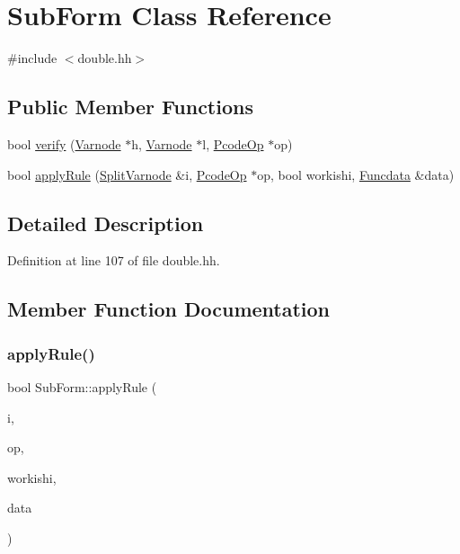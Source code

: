 \hypertarget{class_sub_form}{}\section{Sub\+Form Class Reference}
\label{class_sub_form}


{\ttfamily \#include $<$double.\+hh$>$}

\subsection*{Public Member Functions}
\begin{DoxyCompactItemize}
\item 
bool \mbox{\hyperlink{class_sub_form_a9c6777b111bd5112862b798818ad2250}{verify}} (\mbox{\hyperlink{class_varnode}{Varnode}} $\ast$h, \mbox{\hyperlink{class_varnode}{Varnode}} $\ast$l, \mbox{\hyperlink{class_pcode_op}{Pcode\+Op}} $\ast$op)
\item 
bool \mbox{\hyperlink{class_sub_form_a63a1ea611a21bbd987ad99ce18c8e478}{apply\+Rule}} (\mbox{\hyperlink{class_split_varnode}{Split\+Varnode}} \&i, \mbox{\hyperlink{class_pcode_op}{Pcode\+Op}} $\ast$op, bool workishi, \mbox{\hyperlink{class_funcdata}{Funcdata}} \&data)
\end{DoxyCompactItemize}


\subsection{Detailed Description}


Definition at line 107 of file double.\+hh.



\subsection{Member Function Documentation}
\mbox{\label{class_sub_form_a63a1ea611a21bbd987ad99ce18c8e478}} 
\subsubsection{\texorpdfstring{applyRule()}{applyRule()}}
{\footnotesize\ttfamily bool Sub\+Form\+::apply\+Rule (\begin{DoxyParamCaption}\item[{\mbox{\hyperlink{class_split_varnode}{Split\+Varnode}} \&}]{i,  }\item[{\mbox{\hyperlink{class_pcode_op}{Pcode\+Op}} $\ast$}]{op,  }\item[{bool}]{workishi,  }\item[{\mbox{\hyperlink{class_funcdata}{Funcdata}} \&}]{data }\end{DoxyParamCaption})}



